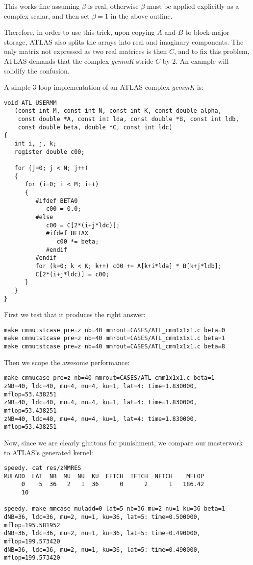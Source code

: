 \documentclass[11pt]{article}
\begin{document}
This works fine assuming $\beta$ is real, otherwise $\beta$ must be applied
explicitly as a complex scalar, and then set $\beta=1$ in the above outline.

Therefore, in order to use this trick, upon copying $A$ and $B$ to block-major
storage, ATLAS also splits the arrays into real and imaginary components.
The only matrix not expressed as two real matrices is then $C$, and to
fix this problem, ATLAS demands that the complex {\it gemmK} stride $C$ by
2.  An example will solidify the confusion.

A simple 3-loop implementation of an ATLAS complex {\it gemmK} is:
\begin{verbatim}
void ATL_USERMM
   (const int M, const int N, const int K, const double alpha,
    const double *A, const int lda, const double *B, const int ldb,
    const double beta, double *C, const int ldc)
{
   int i, j, k;
   register double c00;

   for (j=0; j < N; j++)
   {
      for (i=0; i < M; i++)
      {
         #ifdef BETA0
            c00 = 0.0;
         #else
            c00 = C[2*(i+j*ldc)];
            #ifdef BETAX
               c00 *= beta;
            #endif
         #endif
         for (k=0; k < K; k++) c00 += A[k+i*lda] * B[k+j*ldb];
         C[2*(i+j*ldc)] = c00;
      }
   }
}
\end{verbatim}

First we test that it produces the right answer:
\begin{verbatim}
make cmmutstcase pre=z nb=40 mmrout=CASES/ATL_cmm1x1x1.c beta=0
make cmmutstcase pre=z nb=40 mmrout=CASES/ATL_cmm1x1x1.c beta=1
make cmmutstcase pre=z nb=40 mmrout=CASES/ATL_cmm1x1x1.c beta=8
\end{verbatim}

Then we scope the awesome performance:
\begin{verbatim}
make cmmucase pre=z nb=40 mmrout=CASES/ATL_cmm1x1x1.c beta=1
zNB=40, ldc=40, mu=4, nu=4, ku=1, lat=4: time=1.830000, mflop=53.438251
zNB=40, ldc=40, mu=4, nu=4, ku=1, lat=4: time=1.830000, mflop=53.438251
zNB=40, ldc=40, mu=4, nu=4, ku=1, lat=4: time=1.830000, mflop=53.438251
\end{verbatim}

Now, since we are clearly gluttons for punishment, we compare our
masterwork to ATLAS's generated kernel:
\begin{verbatim}
speedy. cat res/zMMRES 
MULADD  LAT  NB  MU  NU  KU  FFTCH  IFTCH  NFTCH    MFLOP
     0    5  36   2   1  36      0      2      1   186.42
     10

speedy. make mmcase muladd=0 lat=5 nb=36 mu=2 nu=1 ku=36 beta=1
dNB=36, ldc=36, mu=2, nu=1, ku=36, lat=5: time=0.500000, mflop=195.581952
dNB=36, ldc=36, mu=2, nu=1, ku=36, lat=5: time=0.490000, mflop=199.573420
dNB=36, ldc=36, mu=2, nu=1, ku=36, lat=5: time=0.490000, mflop=199.573420
\end{verbatim}
\end{document}
